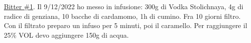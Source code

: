 \serves{-}%
\begin{ingreds}




\end{ingreds}

\begin{method}
\underline{Bitter \#1}. Il 9/12/2022 ho messo in infusione: 300g di Vodka Stolichnaya, 4g di radice di genziana, 10 bacche di cardamomo, 1h di cumino. Fra 10 giorni filtro. Con il filtrato preparo un infuso per 5 minuti, poi il caramello. Per raggiungere il 25\% VOL devo aggiungere 150g di acqua.

\end{method}




